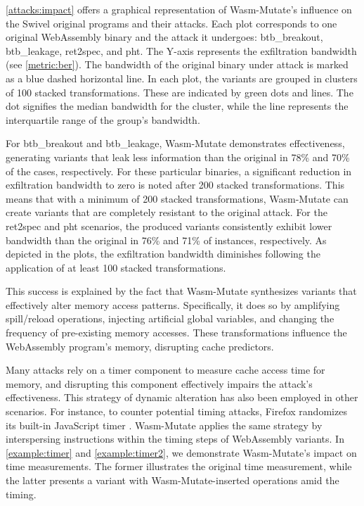 \documentclass[a4paper,fleqn]{cas-dc}
\newcommand{\tool}{{\sc Wasm-Mutate}\xspace}
\newcommand{\Wasm}{WebAssembly\xspace}
\newcommand{\wasm}{\Wasm}
\begin{document}
\autoref{attacks:impact} offers a graphical representation of \tool's influence on the Swivel original programs and their attacks. 
Each plot corresponds to one original \wasm binary and the attack it undergoes: btb\_breakout, btb\_leakage, ret2spec, and pht.
The Y-axis represents the exfiltration bandwidth (see \autoref{metric:ber}). 
The bandwidth of the original binary under attack is marked as a blue dashed horizontal line.
In each plot, the variants are grouped in clusters of 100 stacked transformations. 
These are indicated by green dots and lines. 
The dot signifies the median bandwidth for the cluster, while the line represents the interquartile range of the group's bandwidth.



For btb\_breakout and btb\_leakage, \tool demonstrates effectiveness, generating variants that leak less information than the original in 78\% and 70\% of the cases, respectively.
For these particular binaries, a significant reduction in exfiltration bandwidth to zero is noted after 200 stacked transformations.
This means that with a minimum of 200 stacked transformations, \tool can create variants that are completely resistant to the original attack.
For the ret2spec and pht scenarios, the produced variants consistently exhibit lower bandwidth than the original in 76\% and 71\% of instances, respectively.
As depicted in the plots, the exfiltration bandwidth diminishes following the application of at least  100 stacked transformations.

This success is explained by the fact that \tool synthesizes variants that effectively alter memory access patterns. 
Specifically, it does so by amplifying spill/reload operations, injecting artificial global variables, and changing the frequency of pre-existing memory accesses. 
These transformations influence the \wasm program's memory, disrupting cache predictors. 

Many attacks rely on a timer component to measure cache access time for memory, and disrupting this component effectively impairs the attack's effectiveness. 
This strategy of dynamic alteration has also been employed in other scenarios. 
For instance, to counter potential timing attacks, Firefox randomizes its built-in JavaScript timer \cite{10.1007/978-3-319-70972-7_13}. \tool applies the same strategy by interspersing instructions within the timing steps of \wasm variants. 
In \autoref{example:timer} and \autoref{example:timer2}, we demonstrate \tool's impact on time measurements. 
The former illustrates the original time measurement, while the latter presents a variant with \tool-inserted operations amid the timing.
\end{document}
